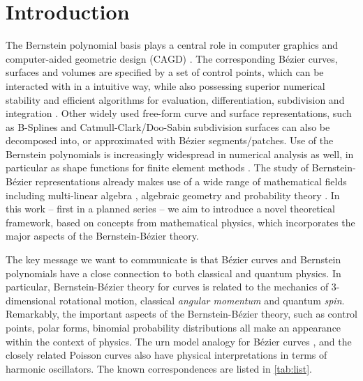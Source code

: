 \documentclass[12pt,final,3p]{elsarticle}
\begin{document}
\section{Introduction}\label{sec:1_intro}
The Bernstein polynomial basis plays a central role in computer graphics and computer-aided geometric design (CAGD) \cite{farin2002curves,gallier2000curves}. The corresponding B\'{e}zier curves, surfaces and volumes are specified by a set of control points, which can be interacted with in a intuitive way, while also possessing superior numerical stability \cite{farouki2012bernstein} and efficient algorithms for evaluation, differentiation, subdivision and integration \cite{goldman2002pyramid}. Other widely used free-form curve and surface representations, such as B-Splines and Catmull-Clark/Doo-Sabin subdivision surfaces can also be decomposed into, or approximated with B\'{e}zier segments/patches. Use of the Bernstein polynomials is increasingly widespread in numerical analysis as well, in particular as shape functions for finite element methods \cite{borden2011isogeometric}. The study of Bernstein-B\'{e}zier representations already makes use of a wide range of mathematical fields including multi-linear algebra \cite{ramshaw2001paired}, algebraic geometry \cite{goldman2003topics} and probability theory \cite{goldman1985polya}. In this work -- first in a planned series -- we aim to introduce a novel theoretical framework, based on concepts from mathematical physics, which incorporates the major aspects of the Bernstein-B\'{e}zier theory. 

The key message we want to communicate is that B\'{e}zier curves and Bernstein polynomials have a close connection to both classical and quantum physics. In particular, Bernstein-B\'{e}zier theory for curves is related to the mechanics of 3-dimensional rotational motion, classical \emph{angular momentum} and quantum \emph{spin}. Remarkably, the important aspects of the Bernstein-B\'{e}zier theory, such as control points, polar forms, binomial probability distributions all make an appearance within the context of physics. The urn model analogy for B\'{e}zier curves \cite{goldman1985polya}, and the closely related Poisson curves \cite{morin2000subdivision,morin2002analytic} also have physical interpretations in terms of harmonic oscillators. The known correspondences are listed in \autoref{tab:list}.
\end{document}
